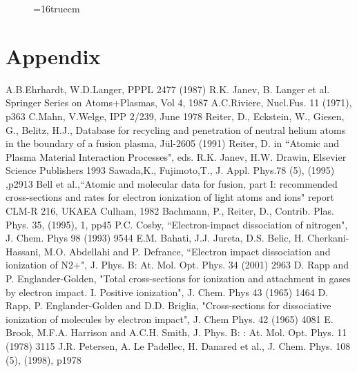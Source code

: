 \documentclass[12pt,dvipdfmx]{article}
\begin{document}
{\begin{small}
\begin{verbatim}
\end{verbatim}\end{small}
\begin{figure} \label{2.0c}
\epsfxsize=16truecm
\end{figure}
\newpage

\section{Appendix}
\newpage
\begin{thebibliography}{99}
  A.B.Ehrhardt, W.D.Langer, PPPL 2477 (1987)
 R.K. Janev, B. Langer et al.  Springer Series on Atoms+Plasmas,
                   Vol 4, 1987
 A.C.Riviere, Nucl.Fus. 11 (1971), p363
 C.Mahn, V.Welge, IPP 2/239, June 1978
 Reiter, D., Eckstein, W., Giesen, G., Belitz,
                    H.J.,
                    Database for recycling and penetration of neutral
                    helium atoms in the boundary of a fusion plasma,
                    J\"ul-2605 (1991)
  Reiter, D. in ``Atomic and Plasma Material Interaction Processes", eds. R.K. Janev, H.W. Drawin, Elsevier Science Publishers 1993
 Sawada,K.,  Fujimoto,T., J. Appl. Phys.78 (5), (1995)
                    ,p2913
  Bell et al.,``Atomic and molecular data for fusion, part I:
recommended cross-sections and rates for electron ionization of light atoms and ions"
 report CLM-R 216, UKAEA Culham, 1982
  Bachmann, P., Reiter, D., Contrib. Plas. Phys.
                       35, (1995), 1, pp45
  P.C. Cosby, ``Electron-impact dissociation of nitrogen", J. Chem. Phys 98 (1993) 9544
 E.M. Bahati, J.J. Jureta, D.S. Belic, H. Cherkani-Hassani, M.O. Abdellahi and P. Defrance, ``Electron impact dissociation and ionization of N2+",
J. Phys. B: At. Mol. Opt. Phys. 34 (2001) 2963
 D. Rapp and P. Englander-Golden, "Total cross-sections for ionization and attachment in gases by electron impact. I. Positive ionization", J. Chem. Phys 43 (1965) 1464
 D. Rapp, P. Englander-Golden and D.D. Briglia, "Cross-sections for dissociative ionization of molecules by electron impact", J. Chem Phys. 42 (1965) 4081
 E. Brook, M.F.A. Harrison and A.C.H. Smith, J. Phys. B: : At. Mol. Opt. Phys. 11 (1978) 3115
 J.R. Petersen, A. Le Padellec, H. Danared et al., J. Chem. Phys. 108 (5), (1998), p1978

\end{thebibliography}}
\end{document}
